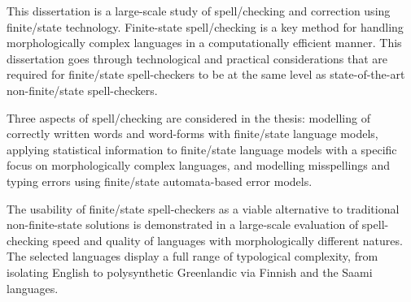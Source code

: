 This dissertation is a large-scale study of spell\-/checking and correction
using finite\-/state technology. Finite-state spell\-/checking is a key method
for handling morphologically complex languages in a computationally
efficient manner. This dissertation goes through technological and practical
considerations that are required for finite\-/state spell-checkers to be at
the same level as state-of-the-art non-finite\-/state spell-checkers. 

Three aspects of spell\-/checking are considered in the thesis: modelling of
correctly written words and word-forms with finite\-/state language
models, applying statistical information to finite\-/state language models
with a specific focus on morphologically complex languages, and modelling
misspellings and typing errors using finite\-/state automata-based error
models.

The usability of finite\-/state spell-checkers as a viable alternative to
traditional non-finite-state solutions is demonstrated in a large-scale
evaluation of spell-checking speed and quality of languages with
morphologically different natures. The selected languages display a
full range of typological complexity, from isolating English to 
polysynthetic Greenlandic via Finnish and the Saami languages.
